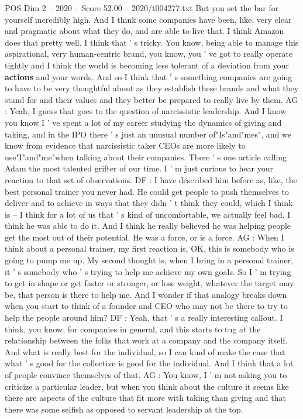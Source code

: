 \begin{textsample}{POS Dim 2 – 2020 – Score 52.00 – 2020/t004277.txt}
But you set the bar for yourself incredibly high.
And I think some companies have been, like, very clear and pragmatic about what they do, and are able to live that.
I think Amazon does that pretty well.
I think that ' s tricky.
You know, being able to manage this aspirational, very human-centric brand, you know, you ' ve got to really operate tightly and I think the world is becoming less tolerant of a deviation from your \textbf{actions} and your words.
And so I think that ' s something companies are going to have to be very thoughtful about as they establish these brands and what they stand for and their values and they better be prepared to really live by them.
AG : Yeah, I guess that goes to the question of narcissistic leadership.
And I know you know I ' ve spent a lot of my career studying the dynamics of giving and taking, and in the IPO there ' s just an unusual number of"Is"and"mes", and we know from evidence that narcissistic taker CEOs are more likely to use"I"and"me"when talking about their companies.
There ' s one article calling Adam the most talented grifter of our time.
I ' m just curious to hear your reaction to that set of observations.
DF : I have described him before as, like, the best personal trainer you never had.
He could get people to push themselves to deliver and to achieve in ways that they didn ' t think they could, which I think is -- I think for a lot of us that ' s kind of uncomfortable, we actually feel bad.
I think he was able to do it.
And I think he really believed he was helping people get the most out of their potential.
He was a force, or is a force.
AG : When I think about a personal trainer, my first reaction is, OK, this is somebody who is going to pump me up.
My second thought is, when I bring in a personal trainer, it ' s somebody who ' s trying to help me achieve my own goals.
So I ' m trying to get in shape or get faster or stronger, or lose weight, whatever the target may be, that person is there to help me.
And I wonder if that analogy breaks down when you start to think of a founder and CEO who may not be there to try to help the people around him?
DF : Yeah, that ' s a really interesting callout.
I think, you know, for companies in general, and this starts to tug at the relationship between the folks that work at a company and the company itself.
And what is really best for the individual, so I can kind of make the case that what ' s good for the collective is good for the individual.
And I think that a lot of people convince themselves of that.
AG : You know, I ' m not asking you to criticize a particular leader, but when you think about the culture it seems like there are aspects of the culture that fit more with taking than giving and that there was some selfish as opposed to servant leadership at the top.

\end{textsample}
